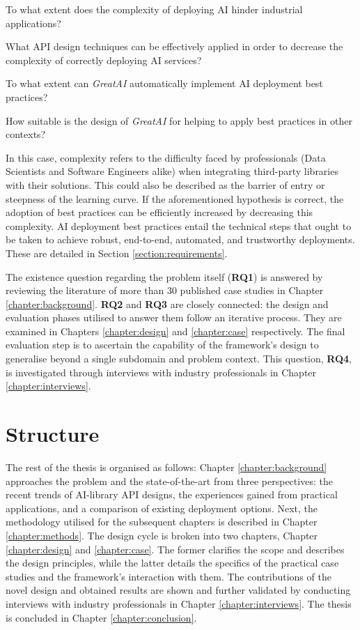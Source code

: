\begin{rqlist}
  \item To what extent does the complexity of deploying AI hinder industrial applications?
  \item What API design techniques can be effectively applied in order to decrease the complexity of correctly deploying AI services?
  \item To what extent can \textit{GreatAI} automatically implement AI deployment best practices?
  \item How suitable is the design of \textit{GreatAI} for helping to apply best practices in other contexts?
\end{rqlist}

In this case, complexity refers to the difficulty faced by professionals (Data Scientists and Software Engineers alike) when integrating third-party libraries with their solutions. This could also be described as the barrier of entry or steepness of the learning curve. If the aforementioned hypothesis is correct, the adoption of best practices can be efficiently increased by decreasing this complexity. AI deployment best practices entail the technical steps that ought to be taken to achieve robust, end-to-end, automated, and trustworthy deployments. These are detailed in Section \ref{section:requirements}.

The existence question regarding the problem itself (\textbf{RQ1}) is answered by reviewing the literature of more than 30 published case studies in Chapter \ref{chapter:background}. \textbf{RQ2} and \textbf{RQ3} are closely connected: the design and evaluation phases utilised to answer them follow an iterative process. They are examined in Chapters \ref{chapter:design} and \ref{chapter:case} respectively. The final evaluation step is to ascertain the capability of the framework's design to generalise beyond a single subdomain and problem context. This question, \textbf{RQ4}, is investigated through interviews with industry professionals in Chapter \ref{chapter:interviews}.

\section{Structure}

The rest of the thesis is organised as follows: Chapter \ref{chapter:background} approaches the problem and the state-of-the-art from three perspectives: the recent trends of AI-library API designs, the experiences gained from practical applications, and a comparison of existing deployment options. Next, the methodology utilised for the subsequent chapters is described in Chapter \ref{chapter:methods}. The design cycle is broken into two chapters, Chapter \ref{chapter:design} and \ref{chapter:case}. The former clarifies the scope and describes the design principles, while the latter details the specifics of the practical case studies and the framework's interaction with them. The contributions of the novel design and obtained results are shown and further validated by conducting interviews with industry professionals in Chapter \ref{chapter:interviews}. The thesis is concluded in Chapter \ref{chapter:conclusion}.
